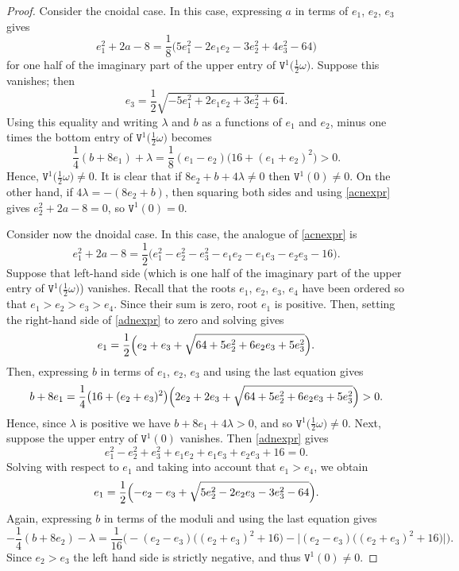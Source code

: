 \documentclass[pdftex]{sigma}
\newcommand\tV{\mathtt{V}}
\numberwithin{equation}{section}
\begin{document}
\begin{proof}
Consider the cnoidal case. In this case, expressing $a$ in terms of $e_1$, $e_2$, $e_3$ gives
\begin{equation}\label{acnexpr}
e_1^2+2a-8=\frac{1}{8}\bigl(5e_1^2-2e_1e_2-3e_2^2+4e_3^2-64\bigr)
\end{equation}
for one half of the imaginary part of the upper entry of $\tV^1\bigl(\tfrac12 \omega\bigr)$. Suppose this vanishes; then
\[e_3=\frac{1}{2}\sqrt{-5e_1^2+2e_1e_2+3e_2^2+64}.\]
Using this equality and writing $\lambda$ and $b$ as a functions of $e_1$ and $e_2$, minus one times the bottom entry of $\tV^1\bigl(\tfrac12 \omega\bigr)$ becomes
\[\frac{1}{4}(b+8e_1)+\lambda = \frac{1}{8}(e_1-e_2)\bigl(16+(e_1+e_2)^2\bigr)>0.\]
Hence, ${\mathtt V}^1\bigl(\tfrac12 \omega\bigr)\neq 0$.
It is clear that if $8e_2+b+4\lambda\neq 0$ then $\tV^1(0) \ne 0$. On the other hand, if $4\lambda = -(8e_2 + b)$, then
squaring both sides and using \eqref{acnexpr} gives $e_2^2+2a-8=0$, so $\tV^1(0)=0$.

Consider now the dnoidal case. In this case, the analogue of \eqref{acnexpr} is
\begin{equation}\label{adnexpr}
e_1^2+2a-8 = \frac12\bigl(e_1^2-e_2^2-e_3^2-e_1 e_2 - e_1 e_3 - e_2 e_3 -16\bigr).
\end{equation}
Suppose that left-hand side \big(which is one half of the imaginary part of the upper entry of $\tV^1\bigl(\tfrac12 \omega\bigr)$\big) vanishes.
Recall that the roots $e_1$, $e_2$, $e_3$, $e_4$ have been ordered so that $e_1>e_2>e_3>e_4$. Since their sum is zero, root $e_1$ is positive. Then, setting the right-hand side of \eqref{adnexpr} to
zero and solving gives
\[e_1=\frac{1}{2}\Bigl(e_2+e_3+\sqrt{64+5e_2^2+6e_2e_3+5e_3^2}\Bigr).\]
Then, expressing $b$ in terms of $e_1$, $e_2$, $e_3$ and using the last equation gives
\[b+8e_1=\frac{1}{4}\bigl(16+(e_2+e_3)^2\bigr)\Bigl(2e_2+2e_3+\sqrt{64+5e_2^2+6e_2e_3+5e_3^2}\Bigr)>0.\]
Hence, since $\lambda$ is positive we have $b+8e_1+4\lambda>0$, and so $\tV^1\bigl(\tfrac12 \omega\bigr) \ne 0$.
Next, suppose the upper entry of $\tV^1(0)$ vanishes. Then \eqref{adnexpr} gives
\[e_1^2-e_2^2+e_3^2+e_1e_2+e_1e_3+e_2e_3+16=0.\]
Solving with respect to $e_1$ and taking into account that $e_1>e_4$, we obtain
\[e_1=\frac{1}{2}\Bigl(-e_2-e_3+\sqrt{5e_2^2-2e_2e_3-3e_3^2-64}\Bigr).\]
Again, expressing $b$ in terms of the moduli and using the last equation gives
\[-\frac{1}{4}(b+8e_2)-\lambda=\frac{1}{16}\bigl(-(e_2-e_3)\bigl((e_2+e_3)^2+16\bigr)-\big|(e_2-e_3)\bigl((e_2+e_3)^2+16\bigr)\big|\bigr).\]
Since $e_2>e_3$ the left hand side is strictly negative, and thus $\tV^1(0)\ne0$.
\end{proof}
\end{document}
